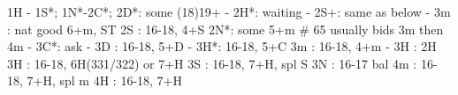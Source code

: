 1H - 1S*; 1N*-2C*; 
2D*: some (18)19+
   - 2H*: waiting
		- 2S+: same as below
   - 3m : nat good 6+m, ST
2S : 16-18, 4+S
2N*: some 5+m  # 65 usually bids 3m then 4m
   - 3C*: ask
		- 3D : 16-18, 5+D
		- 3H*: 16-18, 5+C
3m : 16-18, 4+m
   - 3H : 2H
3H : 16-18, 6H(331/322) or 7+H
3S : 16-18, 7+H, spl S
3N : 16-17 bal
4m : 16-18, 7+H, spl m
4H : 16-18, 7+H
